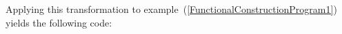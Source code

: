 Applying this transformation to
example~(\ref{FunctionalConstructionProgram1}) yields the following
code:

